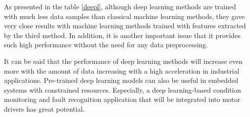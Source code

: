 As presented in the table \ref{deepl}, although deep learning methods are trained with much less data samples than classical machine learning methods, they gave very close results with machine learning methods trained with features extracted by the third method. In addition, it is another important issue that it provides such high performance without the need for any data preprocessing.

It can be said that the performance of deep learning methods will increase even more with the amount of data increasing with a high acceleration in industrial applications. Pre-trained deep learning models can also be useful in embedded systems with constrained resources. Especially, a deep learning-based condition monitoring and fault recognition application that will be integrated into motor drivers has great potential.